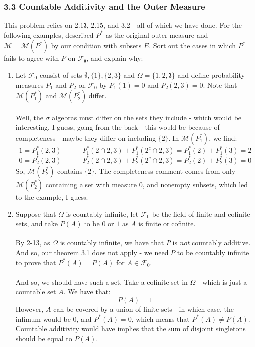 \documentclass[12pt,a4paper]{article}
\newcommand{\1}[1]{\mathbbm{1}\left\{ #1 \right\}}
\newcommand{\fcal}{\mathcal{F}}
\newcommand{\mcal}{\mathcal{M}}
\begin{document}
\subsubsection{3.3 Countable Additivity and the Outer Measure} This problem relies on 2.13, 2.15, and 3.2 - all of which we have done. For the following examples, described $P^*$ as the original outer measure and $\mcal = \mcal(P^*)$ by our condition with subsets $E$. Sort out the cases in which $P^*$ fails to agree with $P$ on $\fcal_0$, and explain why:
\begin{enumerate}
	\item Let $\fcal_0$ consist of sets $\emptyset, \{1\}, \{2, 3\}$ and $\Omega = \{1, 2, 3\}$ and define probability measures $P_1$ and $P_2$ on $\fcal_0$ by $P_1(1) = 0$ and $P_2(2,3) = 0$. Note that $\mcal(P_1^*)$ and $\mcal(P_2^*)$ differ.
	\\\\
	Well, the $\sigma$ algebras must differ on the sets they include - which would be interesting. I guess, going from the back - this would be because of completeness - maybe they differ on including $\{2\}$. In $\mcal(P_1^*)$, we find:
	$$
		1 = P_1^*(2,3)
		\quad\quad\quad
		P_1^*(2 \cap 2,3) + P_1^*(2^c \cap 2,3) =
		P_1^*(2) + P_1^*(3) =  2
	$$	
	$$
		0 = P_2^*(2,3) 
		\quad\quad\quad
		P_2^*(2 \cap 2,3) + P_2^*(2^c \cap 2,3) =
		P_2^*(2) + P_2^*(3) =  0
	$$
	So, $\mcal(P_2^*)$ contains $\{2\}$. The completeness comment comes from only $\mcal(P_2^*)$ containing a set with measure $0$, and nonempty subsets, which led to the example, I guess. 
	
	\item Suppose that $\Omega$ is countably infinite, let $\fcal_0$ be the field of finite and cofinite sets, and take $P(A)$ to be $0$ or $1$ as $A$ is finite or cofinite.
	\\\\
	By 2-13, as $\Omega$ is countably infinite, we have that $P$ is \textit{not} countably additive. And so, our theorem 3.1 does not apply - we need $P$ to be countably infinite to prove that $P^*(A) = P(A)$ for $A \in \fcal_0$.
	\\\\
	And so, we should have such a set. Take a cofinite set in $\Omega$ - which is just a countable set $A$. We have that:
	$$
		P(A) = 1
	$$
	However, $A$ can be covered by a union of finite sets - in which case, the infimum would be $0$, and $P^*(A) = 0$, which means that $P^*(A) \neq P(A)$. Countable additivity would have implies that the sum of disjoint singletons should be equal to $P(A)$.
	

\end{enumerate}
\end{document}
